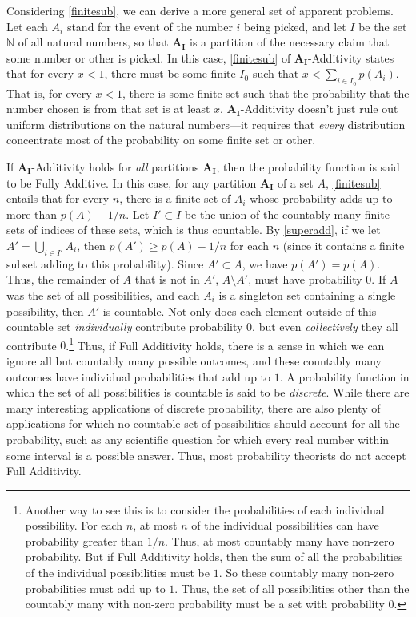 Considering  \autoref{finitesub}, we can derive a more general set of apparent problems. Let each $A_i$ stand for the event of the number $i$ being picked, and let $I$ be the set $\mathbb{N}$ of all natural numbers, so that $\mathbf{A_I}$ is a partition of the necessary claim that some number or other is picked. In this case,  \autoref{finitesub} of $\mathbf{A_I}$-Additivity states that for every $x<1$, there must be some finite $I_0$ such that $x<\sum_{i\in I_0}p(A_i)$. That is, for every $x<1$, there is some finite set such that the probability that the number chosen is from that set is at least $x$. $\mathbf{A_I}$-Additivity doesn't just rule out uniform distributions on the natural numbers---it requires that \emph{every} distribution concentrate most of the probability on some finite set or other.

If $\mathbf{A_I}$-Additivity holds for \emph{all} partitions $\mathbf{A_I}$, then the probability function is said to be Fully Additive. In this case, for any partition $\mathbf{A_I}$ of a set $A$,  \autoref{finitesub} entails that for every $n$, there is a finite set of $A_i$ whose probability adds up to more than $p(A)-1/n$. Let $I'\subset I$ be the union of the countably many finite sets of indices of these sets, which is thus countable. By \autoref{superadd}, if we let $A'=\bigcup_{i\in I'}A_i$, then $p(A')\geq p(A)-1/n$ for each $n$ (since it contains a finite subset adding to this probability). Since $A'\subset A$, we have $p(A')=p(A)$. Thus, the remainder of $A$ that is not in $A'$, $A\setminus A'$, must have probability $0$. If $A$ was the set of all possibilities, and each $A_i$ is a singleton set containing a single possibility, then $A'$ is countable. Not only does each element outside of this countable set \emph{individually} contribute probability $0$, but even \emph{collectively} they all contribute $0$.\footnote{Another way to see this is to consider the probabilities of each individual possibility. For each $n$, at most $n$ of the individual possibilities can have probability greater than $1/n$. Thus, at most countably many have non-zero probability. But if Full Additivity holds, then the sum of all the probabilities of the individual possibilities must be $1$. So these countably many non-zero probabilities must add up to $1$. Thus, the set of all possibilities other than the countably many with non-zero probability must be a set with probability $0$.} Thus, if Full Additivity holds, there is a sense in which we can ignore all but countably many possible outcomes, and these countably many outcomes have individual probabilities that add up to $1$. A probability function in which the set of all possibilities is countable is said to be \textit{discrete}. While there are many interesting applications of discrete probability, there are also plenty of applications for which no countable set of possibilities should account for all the probability, such as any scientific question for which every real number within some interval is a possible answer. Thus, most probability theorists do not accept Full Additivity.

